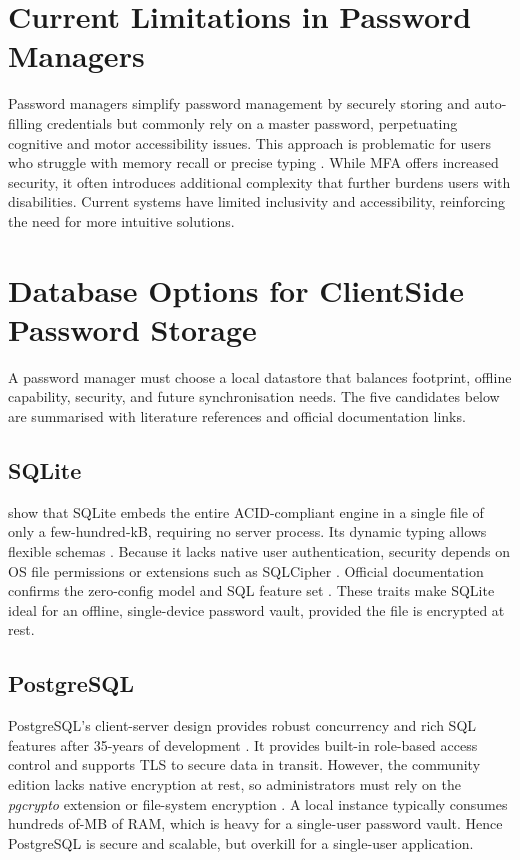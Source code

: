 \section{Current Limitations in Password Managers}
Password managers simplify password management by securely storing and auto-filling credentials but commonly rely on a master password, perpetuating cognitive and motor accessibility issues. This approach is problematic for users who struggle with memory recall or precise typing \autocite{IALabs2024}. While MFA offers increased security, it often introduces additional complexity that further burdens users with disabilities. Current systems have limited inclusivity and accessibility, reinforcing the need for more intuitive solutions.

\section{Database Options for Client\textendash Side Password Storage}
\label{sec:db-options}

A password manager must choose a local datastore that balances footprint,
offline capability, security, and future synchronisation needs.  The five
candidates below are summarised with literature references and official
documentation links.

\subsection*{SQLite}
\textcite{Gaffney2022} show that SQLite embeds the entire ACID-compliant
engine in a single file of only a few-hundred-kB, requiring no server
process.  Its dynamic typing allows flexible schemas \autocite{Corovcak2025}.
Because it lacks native user authentication, security depends on OS file
permissions or extensions such as SQLCipher \autocite{Corovcak2025}.
Official documentation confirms the zero-config model and SQL feature set
\autocite{sqlLiteDoc2025}. These traits make SQLite ideal for an offline,
single-device password vault, provided the file is encrypted at rest.

\subsection*{PostgreSQL}
PostgreSQL's client-server design provides robust concurrency and rich SQL
features after 35-years of development \autocite{Gkamas2022}. It provides 
built-in role-based access control and supports TLS to secure data in transit.
However, the community edition lacks native encryption at rest, so administrators 
must rely on the \textit{pgcrypto} extension or file-system encryption 
\autocite{Crunchy2024, PostgreSQL2025}. A local instance typically consumes hundreds of-MB of RAM,
which is heavy for a single-user password vault. Hence PostgreSQL is secure and scalable,
but overkill for a single-user application.

